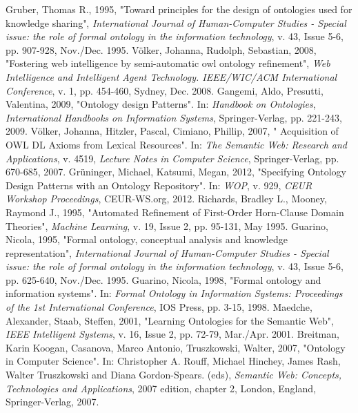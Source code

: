 \begin{thebibliography}{100}
     Gruber, Thomas R., 1995, "Toward principles for the design of ontologies used for knowledge sharing", \textit{International Journal of Human-Computer Studies - Special issue: the role of formal ontology in the information technology}, v. 43, Issue 5-6, pp. 907-928, Nov./Dec. 1995.
     Völker, Johanna, Rudolph, Sebastian, 2008, "Fostering web intelligence by semi-automatic owl ontology refinement", \textit{Web Intelligence and Intelligent Agent Technology. IEEE/WIC/ACM International Conference}, v. 1, pp. 454-460, Sydney, Dec. 2008.
     Gangemi, Aldo, Presutti, Valentina, 2009, "Ontology design Patterns". In: \textit{Handbook on Ontologies}, \textit{International Handbooks on Information Systems}, Springer-Verlag, pp. 221-243, 2009.
     Völker, Johanna, Hitzler, Pascal, Cimiano, Phillip, 2007, " Acquisition of OWL DL Axioms from Lexical Resources". In: \textit{The Semantic Web: Research and Applications}, v. 4519, \textit{Lecture Notes in Computer Science}, Springer-Verlag, pp. 670-685, 2007.
     Grüninger, Michael, Katsumi, Megan, 2012, "Specifying Ontology Design Patterns with an Ontology Repository". In: \textit{WOP}, v. 929, \textit{CEUR Workshop Proceedings}, CEUR-WS.org, 2012.
     Richards, Bradley L., Mooney, Raymond J., 1995, "Automated Refinement of First-Order Horn-Clause Domain Theories", \textit{Machine Learning}, v. 19, Issue 2, pp. 95-131, May 1995.
     Guarino, Nicola, 1995, "Formal ontology, conceptual analysis and knowledge representation", \textit{International Journal of Human-Computer Studies - Special issue: the role of formal ontology in the information technology}, v. 43, Issue 5-6, pp. 625-640, Nov./Dec. 1995.
     Guarino, Nicola, 1998, "Formal ontology and information systems". In: \textit{Formal Ontology in Information Systems: Proceedings of the 1st International Conference}, IOS Press, pp. 3-15, 1998.
     Maedche, Alexander, Staab, Steffen, 2001, "Learning Ontologies for the Semantic Web", \textit{IEEE Intelligent Systems}, v. 16, Issue 2, pp. 72-79, Mar./Apr. 2001.
     Breitman, Karin Koogan, Casanova, Marco Antonio, Truszkowski, Walter, 2007, "Ontology in Computer Science". In: Christopher A. Rouff, Michael Hinchey, James Rash, Walter Truszkowski and Diana Gordon-Spears. (eds), \textit{Semantic Web: Concepts, Technologies and Applications}, 2007 edition, chapter 2, London, England, Springer-Verlag, 2007.

\end{thebibliography}
